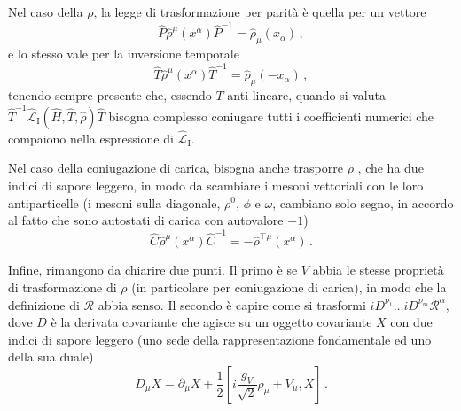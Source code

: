 \documentclass{article}
\begin{document}
Nel caso della $\rho$, la legge di trasformazione per parità è quella per un vettore
\begin{equation}
  \hat{P} \hat{\rho}^\mu(x^\alpha) \hat{P}^{-1} = \hat{\rho}_\mu(x_\alpha) \, , 
\end{equation}
e lo stesso vale per la inversione temporale
\begin{equation}
  \hat{T} \hat{\rho}^\mu(x^\alpha) \hat{T}^{-1} = \hat{\rho}_\mu(-x_\alpha) \, ,
\end{equation}
tenendo sempre presente che, essendo $T$ anti-lineare, quando si valuta $\hat{T}^{-1} \hat{\mathcal{L}}_\text{I}(\hat{H}, \hat{T}, \hat{\rho}) \hat{T}$ bisogna complesso coniugare tutti i coefficienti numerici che compaiono nella espressione di $\hat{\mathcal{L}}_\text{I}$.

Nel caso della coniugazione di carica, bisogna anche trasporre $\rho$ \cite{article:Tyutin}, che ha due indici di sapore leggero, in modo da scambiare i mesoni vettoriali con le loro antiparticelle (i mesoni sulla diagonale, $\rho^0$, $\phi$ e $\omega$, cambiano solo segno, in accordo al fatto che sono autostati di carica con autovalore $-1$)
\begin{equation}
  \hat{C} \hat{\rho}^\mu(x^\alpha) \hat{C}^{-1} = - \hat{\rho}^{\top \mu}(x^\alpha) \, .
\end{equation}

Infine, rimangono da chiarire due punti. Il primo è se $V$ abbia le stesse proprietà di trasformazione di $\rho$ (in particolare per coniugazione di carica), in modo che la definizione di $\mathcal{R}$ abbia senso. Il secondo è capire come si trasformi $i D^{\nu_1} \dots i D^{\nu_m} \mathcal{R}^\alpha$, dove $D$ è la derivata covariante che agisce su un oggetto covariante $X$ con due indici di sapore leggero (uno sede della rappresentazione fondamentale ed uno della sua duale)
\begin{equation}
  D_\mu X = \partial_\mu X + \frac{1}{2} \left[i \frac{g_V}{\sqrt{2}} \rho_\mu + V_\mu, X \right] \, .
  \label{eq:covariant_derivative}
\end{equation}
\end{document}
